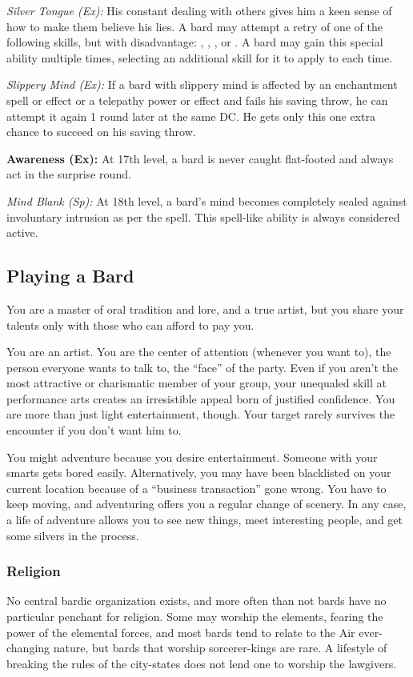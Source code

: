 \textit{Silver Tongue (Ex):} His constant dealing with others gives him a keen sense of how to make them believe his lies. A bard may attempt a retry of one of the following skills, but with disadvantage: , , , or . A bard may gain this special ability multiple times, selecting an additional skill for it to apply to each time.

\textit{Slippery Mind (Ex):} If a bard with slippery mind is affected by an enchantment spell or effect or a telepathy power or effect and fails his saving throw, he can attempt it again 1 round later at the same DC. He gets only this one extra chance to succeed on his saving throw.


\textbf{Awareness (Ex):} At 17th level, a bard is never caught flat-footed and always act in the surprise round.


\textit{Mind Blank (Sp):} At 18th level, a bard's mind becomes completely sealed against involuntary intrusion as per the  spell. This spell-like ability is always considered active.


\subsection{Playing a Bard}
You are a master of oral tradition and lore, and a true artist, but you share your talents only with those who can afford to pay you.

You are an artist. You are the center of attention (whenever you want to), the person everyone wants to talk to, the ``face'' of the party. Even if you aren't the most attractive or charismatic member of your group, your unequaled skill at performance arts creates an irresistible appeal born of justified confidence. You are more than just light entertainment, though. Your target rarely survives the encounter if you don't want him to.

You might adventure because you desire entertainment. Someone with your smarts gets bored easily. Alternatively, you may have been blacklisted on your current location because of a ``business transaction'' gone wrong. You have to keep moving, and adventuring offers you a regular change of scenery. In any case, a life of adventure allows you to see new things, meet interesting people, and get some silvers in the process.

\subsubsection{Religion}
No central bardic organization exists, and more often than not bards have no particular penchant for religion. Some may worship the elements, fearing the power of the elemental forces, and most bards tend to relate to the Air ever-changing nature, but bards that worship sorcerer-kings are rare. A lifestyle of breaking the rules of the city-states does not lend one to worship the lawgivers.

